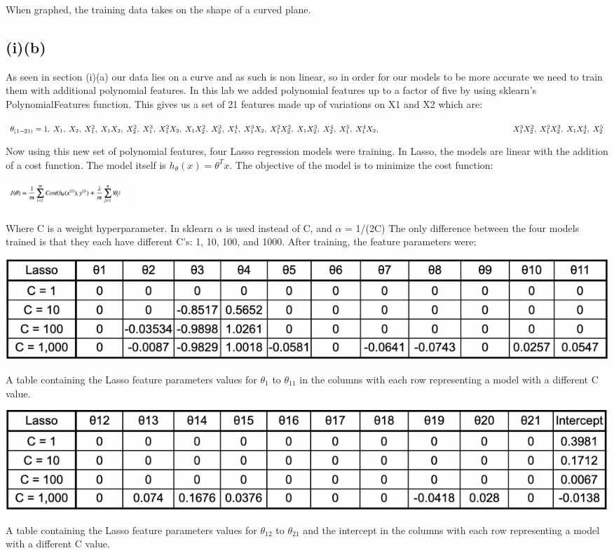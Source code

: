 \documentclass{article}
\begin{document}
When graphed, the training data takes on the shape of a curved plane.

\subsection{(i)(b)}
As seen in section (i)(a) our data lies on a curve and as such is non linear, so in order for our models to be more accurate we need to train them with additional polynomial features. In this lab we added polynomial features up to a factor of five by using sklearn's PolynomialFeatures function. This gives us a set of 21 features made up of variations on X1 and X2 which are:

$\theta_{(1-21)} = 1, \;X_1, \;X_2, \;X_1^2, \;X_1X_2, \;X_2^2,\;X_1^3, \;X_1^2X_2, \;X_1X_2^2, \;X_2^3,\; X_1^4,\; X_1^3X_2, \;X_1^2X_2^2, \;X_1X_2^3, \;X_2^4, \;X_1^5, \;X_1^4X_2,\\ \; \mathbin{\qquad} \mathbin{\qquad} \mathbin{\qquad} \mathbin{\qquad} \mathbin{\qquad} \mathbin{\qquad}  \mathbin{\qquad} \mathbin{\quad} X_1^3X_2^2, \;X_1^2X_2^3, \;X_1X_2^4, \;X_2^5$

Now using this new set of polynomial features, four Lasso regression models were training. In Lasso, the models are linear with the addition of a cost function. The model itself is $h_\theta(x)=\theta^Tx$. The objective of the model is to minimize the cost function:
\begin{center}
\includegraphics[width=.3\linewidth, height=1cm]{f.png}
\end{center}
Where C is a weight hyperparameter. In sklearn $\alpha$ is used instead of C, and $\alpha$ = 1/(2C)
The only difference between the four models trained is that they each have different C's: 1, 10, 100, and 1000. After training, the feature parameters were:
\begin{center}
\includegraphics[width=\linewidth]{t1.png}
\caption{A table containing the Lasso feature parameters values for $\theta_1$  to  $\theta_{11}$  in the columns with each row representing a model with a different C value.}
\end{center}
\begin{center}
\includegraphics[width=\linewidth]{t2.png}
\caption{A table containing the Lasso feature parameters values for $\theta_12$  to  $\theta_{21}$ and the intercept in the columns with each row representing a model with a different C value.}
\end{center}
\end{document}
